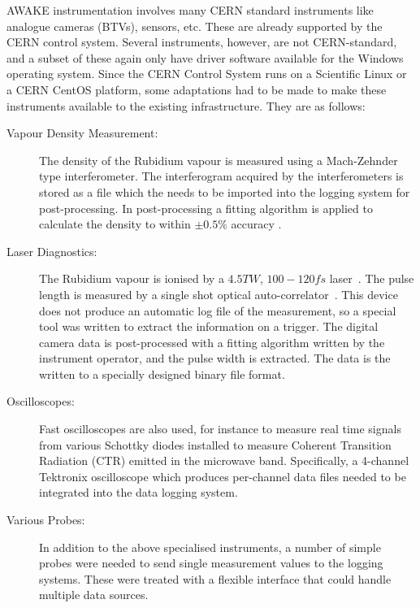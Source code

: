 AWAKE instrumentation involves many CERN standard instruments like analogue cameras (BTVs), sensors, etc.
These are already supported by the CERN control system.
Several instruments, however, are not CERN-standard, and a subset of these again only have driver software available for the Windows operating system.
Since the CERN Control System runs on a Scientific Linux or a CERN CentOS platform, some adaptations had to be made to make these instruments available to the existing infrastructure.
They are as follows:
\begin{description}
    \item[Vapour Density Measurement:]
    The density of the Rubidium vapour is measured using a Mach-Zehnder type interferometer.
    The interferogram acquired by the interferometers is stored as a file which the needs to be imported into the logging system for post-processing.
    In post-processing a fitting algorithm is applied to calculate the density to within $\pm0.5\%$ accuracy \cite{oz:2016}.
    
    \item[Laser Diagnostics:]
    The Rubidium vapour is ionised by a $4.5\unit{TW}$, $100-120\unit{fs}$ laser~\cite{gschwendtner:2016}.
    The pulse length is measured by a single shot optical auto-correlator~\cite{salin:1987}.
    This device does not produce an automatic log file of the measurement, so a special tool was written to extract the information on a trigger.
    The digital camera data is post-processed with a fitting algorithm written by the instrument operator, and the pulse width is extracted.
    The data is the written to a specially designed binary file format.
    
    \item[Oscilloscopes:]
    Fast oscilloscopes are also used, for instance to measure real time signals from various Schottky diodes installed to measure Coherent Transition Radiation (CTR) emitted in the microwave band.
    Specifically, a 4-channel Tektronix oscilloscope which produces per-channel data files needed to be integrated into the data logging system.
    
    \item[Various Probes:]
    In addition to the above specialised instruments, a number of simple probes were needed to send single measurement values to the logging systems.
    These were treated with a flexible interface that could handle multiple data sources.
\end{description}

